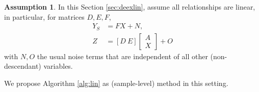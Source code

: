\documentclass[letterpaper]{article} %
\theoremstyle{definition}%
\theoremstyle{definition}
\newtheorem{assumption}{Assumption} %
\newcommand{\Obs}{Y}
\newcommand{\Out}{Z}
\begin{document}

\newcommand{\Oa}{W}
\newcommand{\oa}{w}
\newcommand{\om}{F}
\newcommand{\No}{N}
\newcommand{\no}{n}
\newcommand{\Noz}{O}
\newcommand{\noz}{o}

\newcommand{\stax}{\left[\begin{smallmatrix}A \\ X\end{smallmatrix}\right]}

\newcommand{\samplelen}{\ell}

\newcommand{\idm}{\mathbf{1}}


\begin{assumption}
	\label{eqn:contas}
	In this Section \ref{sec:deexlin}, assume all relationships are linear, in particular, for matrices $D, E, F$,
	\begin{align}
	\Obs_S &= \om X + \No ,\quad \label{eqn:c1} \\ %
	\Out &= [D\ E] \left[
	\begin{array}{c}
	A \\ X
	\end{array}
	\right]
	+ \Noz \label{eqn:c2}
	\end{align}
	with $\No, \Noz$ the usual noise terms that are independent of all other (non-descendant) variables.
\end{assumption}%
We propose Algorithm \ref{alg:lin} as (sample-level) method in this setting.
\end{document}
